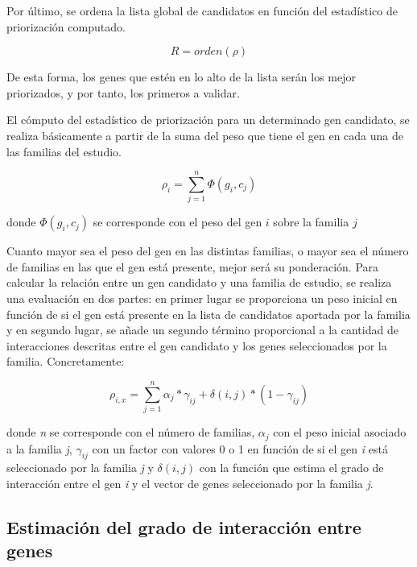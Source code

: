 \medskip
Por último, se ordena la lista global de candidatos en función del estadístico de priorización computado.

\begin{equation}
R = orden(\rho)
\end{equation}

\medskip
De esta forma, los genes que estén en lo alto de la lista serán los mejor priorizados, y por tanto, los primeros a validar.

\medskip
El cómputo del estadístico de priorización para un determinado gen candidato, se realiza básicamente a partir de la suma del peso que tiene el gen en cada una de las familias del estudio. 

\begin{equation}
\rho_i =  \sum_{j=1}^{n}  \Phi(g_i,c_j)
\end{equation}

\medskip
donde $\Phi(g_i,c_j)$ se corresponde con el peso del gen $i$ sobre la familia $j$

\medskip
Cuanto mayor sea el peso del gen en las distintas familias, o mayor sea el número de familias en las que el gen está presente, mejor será su ponderación. Para calcular la relación entre un gen candidato y una familia de estudio, se realiza una evaluación en dos partes: en primer lugar se proporciona un peso inicial en función de si el gen está presente en la lista de candidatos aportada por la familia y en segundo lugar, se añade un segundo término proporcional a la cantidad de interacciones descritas entre el gen candidato y los genes seleccionados por la familia. Concretamente:

\begin{equation}
\rho_{i,x} = \sum_{j=1}^{n} \alpha_j * \gamma_{ij} + \delta(i,j) * (1-\gamma_{ij})
\end{equation}

\medskip
donde \textit{n} se corresponde con el número de familias, $\alpha_j$ con el peso inicial asociado a la familia \textit{j}, $\gamma_{ij}$ con un factor con valores 0 o 1 en función de si el gen \textit{i} está seleccionado por la familia \textit{j} y $\delta(i,j)$ con la función que estima el grado de interacción entre el gen \textit{i} y el vector de genes seleccionado por la familia \textit{j}.


\subsection{Estimación del grado de interacción entre genes}

